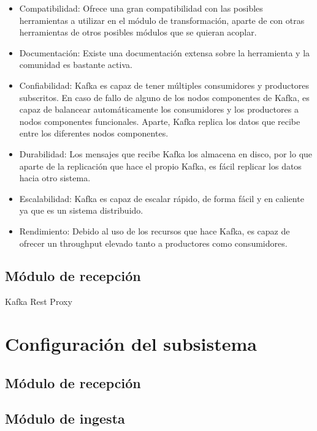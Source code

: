\begin{itemize}
	\item Compatibilidad: Ofrece una gran compatibilidad con las posibles herramientas a utilizar en el módulo de transformación, aparte de con otras herramientas de otros posibles módulos que se quieran acoplar.
	
	\item Documentación: Existe una documentación extensa sobre la herramienta y la comunidad es bastante activa.
	
	\item Confiabilidad: Kafka es capaz de tener múltiples consumidores y productores subscritos. En caso de fallo de alguno de los nodos componentes de Kafka, es capaz de balancear automáticamente los consumidores y los productores a nodos componentes funcionales. Aparte, Kafka replica los datos que recibe entre los diferentes nodos componentes.
	
	\item Durabilidad: Los mensajes que recibe Kafka los almacena en disco, por lo que aparte de la replicación que hace el propio Kafka, es fácil replicar los datos hacia otro sistema.
	
	\item Escalabilidad: Kafka es capaz de escalar rápido, de forma fácil y en caliente ya que es un sistema distribuido.
	
	\item Rendimiento: Debido al uso de los recursos que hace Kafka, es capaz de ofrecer un throughput elevado tanto a productores como consumidores.
\end{itemize}

\subsection{Módulo de recepción}
Kafka Rest Proxy\cite{Tfg:kafkarestproxy}

\section{Configuración del subsistema}

\subsection{Módulo de recepción}
\subsection{Módulo de ingesta}

